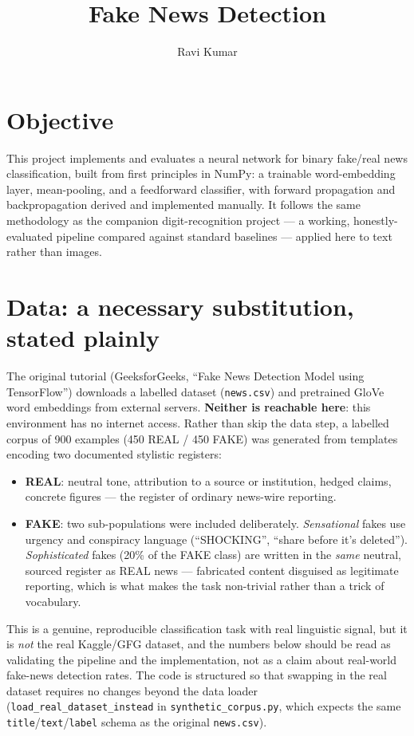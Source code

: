 \documentclass[12pt]{article}
\title{\textbf{\Large Fake News Detection}}
\author{Ravi Kumar}
\date{}
\begin{document}
\maketitle
\vspace{-1.5em}

\section{Objective}
This project implements and evaluates a neural network for binary fake/real news classification, built from first principles in NumPy: a trainable word-embedding layer, mean-pooling, and a feedforward classifier, with forward propagation and backpropagation derived and implemented manually. It follows the same methodology as the companion digit-recognition project --- a working, honestly-evaluated pipeline compared against standard baselines --- applied here to text rather than images.

\section{Data: a necessary substitution, stated plainly}
The original tutorial (GeeksforGeeks, ``Fake News Detection Model using TensorFlow'') downloads a labelled dataset (\texttt{news.csv}) and pretrained GloVe word embeddings from external servers. \textbf{Neither is reachable here}: this environment has no internet access. Rather than skip the data step, a labelled corpus of 900 examples (450 REAL / 450 FAKE) was generated from templates encoding two documented stylistic registers:

\begin{itemize}[leftmargin=1.4em]
\item \textbf{REAL}: neutral tone, attribution to a source or institution, hedged claims, concrete figures --- the register of ordinary news-wire reporting.
\item \textbf{FAKE}: two sub-populations were included deliberately. \emph{Sensational} fakes use urgency and conspiracy language (``SHOCKING'', ``share before it's deleted''). \emph{Sophisticated} fakes (20\% of the FAKE class) are written in the \emph{same} neutral, sourced register as REAL news --- fabricated content disguised as legitimate reporting, which is what makes the task non-trivial rather than a trick of vocabulary.
\end{itemize}

This is a genuine, reproducible classification task with real linguistic signal, but it is \emph{not} the real Kaggle/GFG dataset, and the numbers below should be read as validating the pipeline and the implementation, not as a claim about real-world fake-news detection rates. The code is structured so that swapping in the real dataset requires no changes beyond the data loader (\texttt{load\_real\_dataset\_instead} in \texttt{synthetic\_corpus.py}, which expects the same \texttt{title}/\texttt{text}/\texttt{label} schema as the original \texttt{news.csv}).
\end{document}

